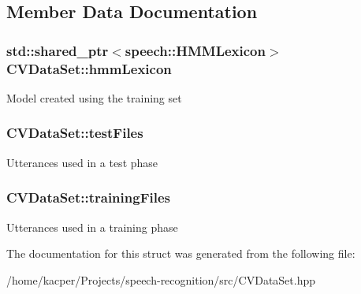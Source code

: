 \subsection{Member Data Documentation}
\hypertarget{structCVDataSet_a662cfb97a8b9fbfb9fd7ee1624f418d1}{
\subsubsection[{hmm\+Lexicon}]{\setlength{\rightskip}{0pt plus 5cm}std\+::shared\+\_\+ptr$<${\bf speech\+::\+H\+M\+M\+Lexicon}$>$ C\+V\+Data\+Set\+::hmm\+Lexicon}}\label{structCVDataSet_a662cfb97a8b9fbfb9fd7ee1624f418d1}
Model created using the training set \hypertarget{structCVDataSet_ad1c35b1bb525b6237f8e15d1f044cd30}{
\subsubsection[{test\+Files}]{ C\+V\+Data\+Set\+::test\+Files}}\label{structCVDataSet_ad1c35b1bb525b6237f8e15d1f044cd30}
Utterances used in a test phase \hypertarget{structCVDataSet_ada9a89e03d407ce7e7164ea1327e6f67}{
\subsubsection[{training\+Files}]{ C\+V\+Data\+Set\+::training\+Files}}\label{structCVDataSet_ada9a89e03d407ce7e7164ea1327e6f67}
Utterances used in a training phase 

The documentation for this struct was generated from the following file\+:\begin{DoxyCompactItemize}
\item 
/home/kacper/\+Projects/speech-\/recognition/src/C\+V\+Data\+Set.\+hpp\end{DoxyCompactItemize}
